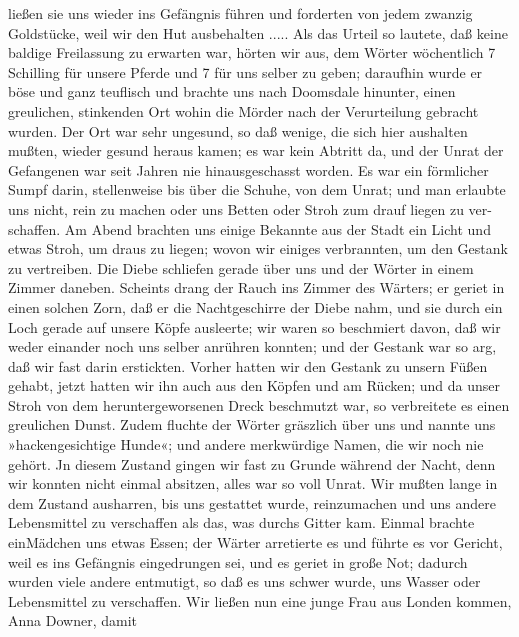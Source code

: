 ließen sie uns wieder ins Gefängnis führen und forderten von
jedem zwanzig Goldstücke, weil wir den Hut ausbehalten .....
Als das Urteil so lautete, daß keine baldige Freilassung
zu erwarten war, hörten wir aus, dem Wörter wöchentlich
7 Schilling für unsere Pferde und 7 für uns selber zu geben;
daraufhin wurde er böse und ganz teuflisch und brachte uns nach
Doomsdale hinunter, einen greulichen, stinkenden Ort wohin die
Mörder nach der Verurteilung gebracht wurden. Der Ort war
sehr ungesund, so daß wenige, die sich hier aushalten mußten,
wieder gesund heraus kamen; es war kein Abtritt da, und der
Unrat der Gefangenen war seit Jahren nie hinausgeschasst worden.
Es war ein förmlicher Sumpf darin, stellenweise bis über die
Schuhe, von dem Unrat; und man erlaubte uns nicht, rein zu
machen oder uns Betten oder Stroh zum drauf liegen zu ver-
schaffen. Am Abend brachten uns einige Bekannte aus der Stadt
ein Licht und etwas Stroh, um draus zu liegen; wovon wir einiges
verbrannten, um den Gestank zu vertreiben. Die Diebe schliefen
gerade über uns und der Wörter in einem Zimmer daneben.
Scheints drang der Rauch ins Zimmer des Wärters; er geriet
in einen solchen Zorn, daß er die Nachtgeschirre der Diebe nahm,
und sie durch ein Loch gerade auf unsere Köpfe ausleerte; wir
waren so beschmiert davon, daß wir weder einander noch uns selber
anrühren konnten; und der Gestank war so arg, daß wir fast
darin erstickten. Vorher hatten wir den Gestank zu unsern Füßen
gehabt, jetzt hatten wir ihn auch aus den Köpfen und am Rücken;
und da unser Stroh von dem heruntergeworsenen Dreck beschmutzt
war, so verbreitete es einen greulichen Dunst. Zudem fluchte der
Wörter gräszlich über uns und nannte uns »hackengesichtige Hunde«;
und andere merkwürdige Namen, die wir noch nie gehört. Jn
diesem Zustand gingen wir fast zu Grunde während der Nacht,
denn wir konnten nicht einmal absitzen, alles war so voll Unrat.
Wir mußten lange in dem Zustand ausharren, bis uns gestattet
wurde, reinzumachen und uns andere Lebensmittel zu verschaffen als
das, was durchs Gitter kam. Einmal brachte einMädchen uns etwas
Essen; der Wärter arretierte es und führte es vor Gericht, weil
es ins Gefängnis eingedrungen sei, und es geriet in große Not;
dadurch wurden viele andere entmutigt, so daß es uns schwer
wurde, uns Wasser oder Lebensmittel zu verschaffen. Wir ließen
nun eine junge Frau aus Londen kommen, Anna Downer, damit


